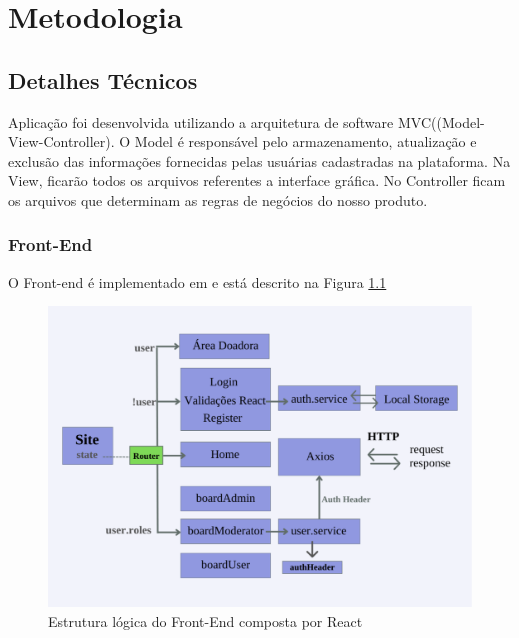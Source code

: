\chapter{Metodologia}
\section{Detalhes Técnicos}
\label{sec:tech}

Aplicação foi desenvolvida utilizando a arquitetura de software MVC((Model-View-Controller).
O Model é responsável pelo armazenamento, atualização e exclusão das informações fornecidas pelas usuárias cadastradas na plataforma.
Na View, ficarão todos os arquivos referentes a interface gráfica.
No Controller ficam os arquivos que determinam as regras de negócios do nosso produto.

\subsection{Front-End}
O Front-end é implementado em \cite{React} e está descrito na Figura \ref{fig:logicFront}

\begin{figure}[h!]
    \centering
    \includegraphics[width=1.0\textwidth]{Figuras/Frontpdf.pdf}
    \caption{Estrutura lógica do Front-End composta por React}
    \label{fig:logicFront}
\end{figure}

